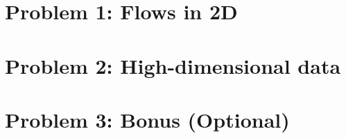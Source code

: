 \documentclass[11pt,letterpaper]{article}
\begin{document}
\section*{Problem 1: Flows in 2D}

\newpage
\null\newpage

\section*{Problem 2: High-dimensional data}

\newpage
\null\newpage


\section*{Problem 3: Bonus (Optional)}

\newpage
\null\newpage
\end{document}
